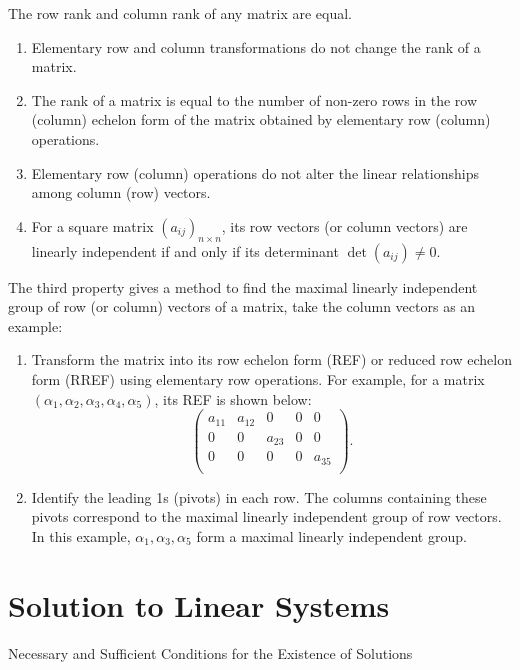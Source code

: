 \documentclass[11pt]{../../TexTemplate/elegantbook} %
\begin{document}
\begin{theorem}
    The row rank and column rank of any matrix are equal.
\end{theorem}

\begin{property}
    \begin{enumerate}
        \item Elementary row and column transformations do not change the rank of a matrix.
        \item The rank of a matrix is equal to the number of non-zero rows in the row (column) echelon form of the matrix 
            obtained by elementary row (column) operations.
        \item Elementary row (column) operations do not alter the linear relationships among column (row) vectors.
        \item For a square matrix \(\left( a_{ij} \right)_{n\times n} \), its row vectors (or column vectors) are 
            linearly independent if and only if its determinant \( \det(a_{ij}) \neq 0 \).
    \end{enumerate}
\end{property}
The third property gives a method to find the maximal linearly independent group of row (or column) vectors of a matrix,
take the column vectors as an example:
\begin{enumerate}
    \item Transform the matrix into its row echelon form (REF) or reduced row echelon form (RREF) using elementary row operations.
        For example, for a matrix \( \left( \alpha_{1}, \alpha_{2}, \alpha_{3}, \alpha_{4}, \alpha_{5} \right) \),
        its REF is shown below:
        \[
        \begin{pmatrix}
        a_{11} & a_{12} & 0 & 0 & 0 \\
        0 & 0 & a_{23} & 0 & 0 \\
        0 & 0 & 0 & 0 & a_{35} \\
        \end{pmatrix}.
        \]
    \item Identify the leading 1s (pivots) in each row. The columns containing these pivots correspond to the maximal linearly independent group of row vectors.
        In this example, \(\alpha_{1}, \alpha_{3}, \alpha_{5}\) form a maximal linearly independent group.
\end{enumerate}


\section{Solution to Linear Systems}
\begin{leftbarTitle}{Necessary and Sufficient Conditions for the Existence of Solutions}\end{leftbarTitle}
\end{document}
